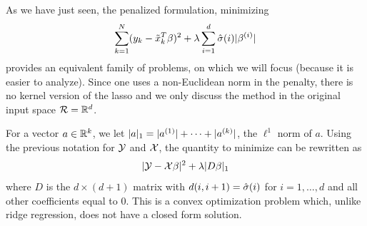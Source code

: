 As we have just seen, the penalized formulation, minimizing
\[
\sum_{k=1}^N (y_k - {\tilde{x}}_k^T\beta)^2 + \lambda \sum_{i=1}^d \hat {\sigma}(i)|\beta^{(i)}|
\]
provides an equivalent family of problems, on which we will focus (because it is easier to analyze). Since one uses a non-Euclidean norm in the penalty, there is no kernel version of the lasso and we only discuss the method in the original input space ${\mathcal R} = {\mathbb{R}}^d$.


For a vector $a\in {\mathbb{R}}^k$, we let $|a|_1 = |a^{(1)}| + \cdots + |a^{(k)}|$, the $\ell^1$ norm of $a$. 
Using the previous notation for ${\mathcal Y}$ and ${\mathcal X}$, the quantity to minimize can be rewritten as
\[
|{\mathcal Y} - {\mathcal X}\beta|^2 + \lambda |D\beta|_1
\]
where $D$ is the $d \times (d+1)$ matrix with $d(i,i+1) = \hat{\sigma}(i)$ for $i=1, \ldots, d$ and all other coefficients equal to 0. This is a convex optimization problem which, unlike ridge regression, does not have a closed form solution.

